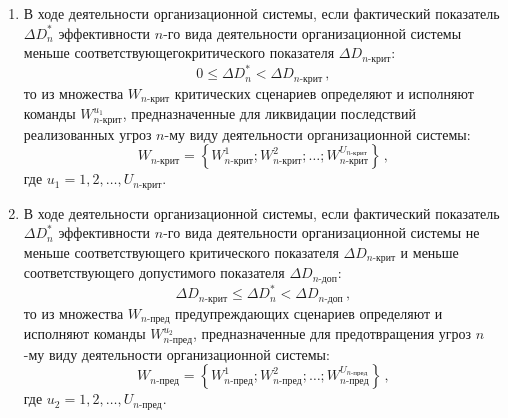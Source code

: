 \begin{multicols}{2}
\begin{enumerate}[1.]
\item В ходе деятельности организационной сис\-те\-мы, если фактический показатель
$\Delta D_n^*$ эффективности $n$-го вида деятельности организационной системы
меньше соответствующего\linebreak критического показателя $\Delta D_{n\mbox{-}\mathrm{крит}}$:
\begin{equation*}
     0 \leq \Delta D_n^* < \Delta D_{n\mbox{-}\mathrm{крит}}\,,
     \end{equation*}
     то из множества $W_{n\mbox{-}\mathrm{крит}}$ критических
сценариев определяют и исполняют команды
     $W^{u_1}_{n\mbox{-}\mathrm{крит}}$, предназначенные для
ликвидации последствий реализованных угроз $n$-му виду
деятельности организационной системы:
     \begin{equation*}
     W_{n\mbox{-}\mathrm{крит}} = \left\{W^1_{n\mbox{-}\mathrm{крит}};
     W^2_{n\mbox{-}\mathrm{крит}}; \ldots  ;
     W^{U_{n\mbox{-}\mathrm{крит}}}_{n\mbox{-}\mathrm{крит}}\right\}\,,	
     \end{equation*}
     где $u_1 = 1, 2, \ldots, U_{n\mbox{-}\mathrm{крит}}$.

\item В ходе деятельности организационной сис\-темы, если фактический показатель
$\Delta D^*_n$ эффектив\-ности $n$-го вида деятельности организационной сис\-те\-мы не
меньше соответствующего критического показателя $\Delta D_{n\mbox{-}\mathrm{крит}}$ и
меньше соответствующего допустимого показателя $\Delta D_{n\mbox{-}\mathrm{доп}}$:
\begin{equation*}
      \Delta D_{n\mbox{-}\mathrm{крит}}\leq  \Delta D_n^* < \Delta
D_{n\mbox{-}\mathrm{доп}}\,,
      \end{equation*}
      то из множества $W_{n\mbox{-}\mathrm{пред}}$ предупреждающих
сценариев определяют и исполняют команды
      $W^{u_2}_{n\mbox{-}\mathrm{пред}}$, предназначенные для
предотвращения угроз $n$-му виду деятельности организационной
системы:
      \begin{equation*}
     W_{n\mbox{-}\mathrm{пред}} = \left\{W^1_{n\mbox{-}\mathrm{пред}};
     W^2_{n\mbox{-}\mathrm{пред}}; \ldots ;
     W^{U_{n\mbox{-}\mathrm{пред}}}_{n\mbox{-}\mathrm{пред}}\right\}\,,
     \end{equation*}
     где $u_2 = 1, 2, \ldots , U_{n\mbox{-}\mathrm{пред}}$.


\end{enumerate}
\end{multicols}
